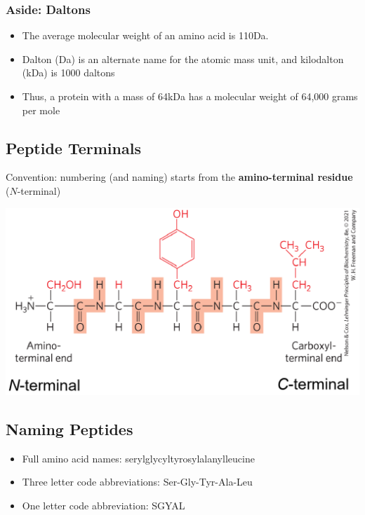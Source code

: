 \documentclass[10pt]{article}
\begin{document}
\subsubsection*{Aside: Daltons}
\begin{itemize}
    \item The average molecular weight of an amino acid is 110Da.
    \item Dalton (Da) is an alternate name for the atomic mass unit, and kilodalton (kDa) is 1000 daltons
    \item Thus, a protein with a mass of 64kDa has a molecular weight of 64,000 grams per mole
\end{itemize}
\subsection*{Peptide Terminals}
Convention: numbering (and naming) starts from the \textbf{amino-terminal residue} ($N$-terminal)
\begin{center}
    \includegraphics*[width=\textwidth]{L2_10.png}
\end{center}
\subsection*{Naming Peptides}
\begin{itemize}
    \item Full amino acid names: serylglycyltyrosylalanylleucine
    \item Three letter code abbreviations: Ser-Gly-Tyr-Ala-Leu
    \item One letter code abbreviation: SGYAL
\end{itemize}
\end{document}
